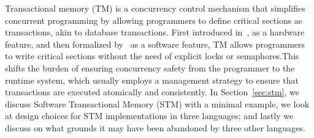 Transactional memory (TM) is a concurrency control mechanism
that simplifies concurrent programming by allowing programmers
to define critical sections as transactions, akin to database transactions.
First introduced in~\cite{herlihy1993hardware},
as a hardware feature, and then formalized by~\cite{shavit1995software}
as a software feature, TM allows programmers to write critical sections without the need of 
explicit locks or semaphores.This shifts the burden of ensuring concurrency safety
from the programmer to the runtime system, which usually employs a management strategy
to ensure that transactions are executed atomically and consistently.
In Section~\ref{sec:stm}, we discuss Software Transactional Memory (STM) with a minimal example,
we look at design choices for STM implementations in three languages; 
and lastly we discuss on what grounds it may have been abandoned by three other languages.
 